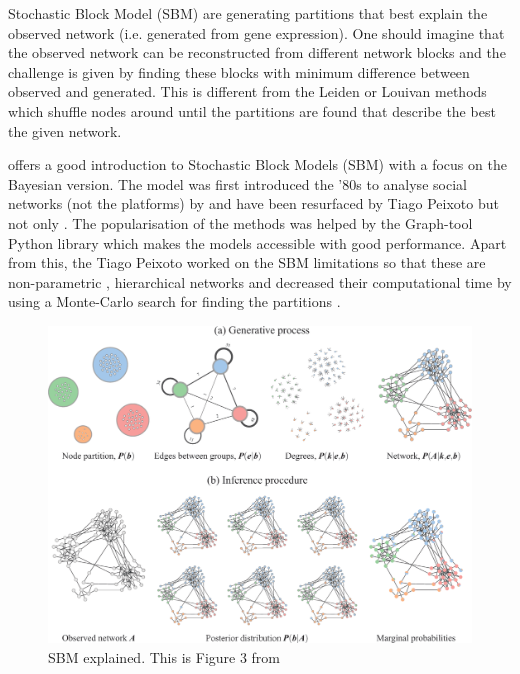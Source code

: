 Stochastic Block Model (SBM) are generating partitions that best explain the observed network (i.e. generated from gene expression). One should imagine that the observed network can be reconstructed from different network blocks and the challenge is given by finding these blocks with minimum difference between observed and generated. This is  different from the Leiden or Louivan methods which shuffle nodes around until the partitions are found that describe the best the given network. 

\citet{Peixoto2019-fg} offers a good introduction to Stochastic Block Models (SBM) with a focus on the Bayesian version. The model was first introduced the '80s to analyse social networks (not the platforms) by \citet{Holland1983-eu} and have been resurfaced by Tiago Peixoto \cite{Peixoto2014-ls, Peixoto2017-gc, Peixoto2018-ot} but not only \cite{Karrer2011-si}. The popularisation of the methods was helped by the Graph-tool Python library \citet{Peixoto2014-ls} which makes the models accessible with good performance. Apart from this, the Tiago Peixoto worked on the SBM limitations so that these are non-parametric \citet{Peixoto2017-gc, Peixoto2018-ot}, hierarchical networks \citet{Peixoto2014-yb} and decreased their computational time by using a Monte-Carlo search for finding the partitions \cite{Peixoto2014-ss}.

\begin{figure}[!htb]    
    \centering
    \includegraphics[width=1.0\textwidth,height=1.0\textheight,keepaspectratio]{Sections/Network_I/Resources/dc-sbm_explained.png}
    \caption{SBM explained. This is Figure 3 from \citet{Peixoto2021-jx}}
    \label{fig:N_I:dc-sbm_explained}
\end{figure}


